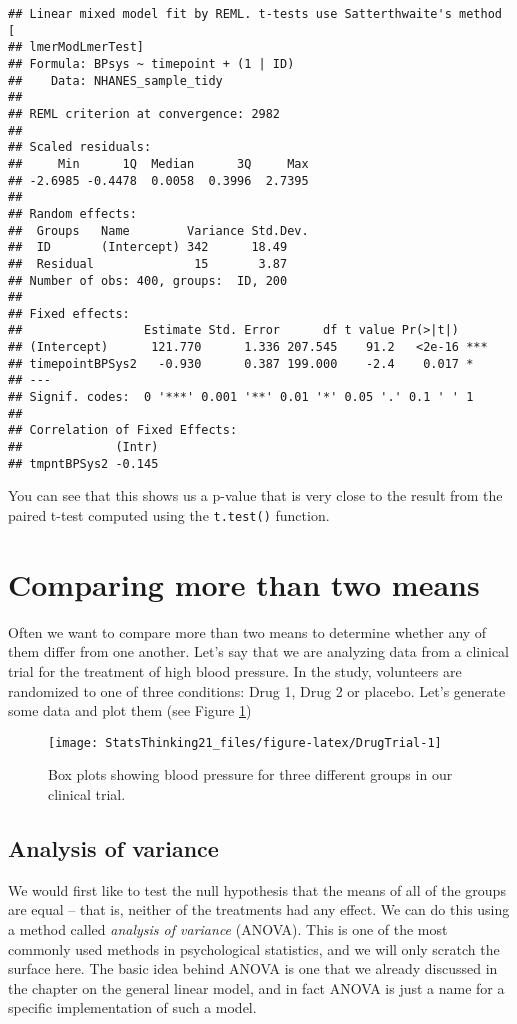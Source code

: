 \documentclass[]{book}
\theoremstyle{definition}
\theoremstyle{definition}
\theoremstyle{definition}
\theoremstyle{remark}
\begin{document}
\begin{verbatim}
## Linear mixed model fit by REML. t-tests use Satterthwaite's method [
## lmerModLmerTest]
## Formula: BPsys ~ timepoint + (1 | ID)
##    Data: NHANES_sample_tidy
## 
## REML criterion at convergence: 2982
## 
## Scaled residuals: 
##     Min      1Q  Median      3Q     Max 
## -2.6985 -0.4478  0.0058  0.3996  2.7395 
## 
## Random effects:
##  Groups   Name        Variance Std.Dev.
##  ID       (Intercept) 342      18.49   
##  Residual              15       3.87   
## Number of obs: 400, groups:  ID, 200
## 
## Fixed effects:
##                 Estimate Std. Error      df t value Pr(>|t|)    
## (Intercept)      121.770      1.336 207.545    91.2   <2e-16 ***
## timepointBPSys2   -0.930      0.387 199.000    -2.4    0.017 *  
## ---
## Signif. codes:  0 '***' 0.001 '**' 0.01 '*' 0.05 '.' 0.1 ' ' 1
## 
## Correlation of Fixed Effects:
##             (Intr)
## tmpntBPSys2 -0.145
\end{verbatim}

You can see that this shows us a p-value that is very close to the
result from the paired t-test computed using the \texttt{t.test()}
function.

\section{Comparing more than two
means}\label{comparing-more-than-two-means}

Often we want to compare more than two means to determine whether any of
them differ from one another. Let's say that we are analyzing data from
a clinical trial for the treatment of high blood pressure. In the study,
volunteers are randomized to one of three conditions: Drug 1, Drug 2 or
placebo. Let's generate some data and plot them (see Figure
\ref{fig:DrugTrial})

\begin{figure}
\texttt{[image: StatsThinking21\_files/figure-latex/DrugTrial-1]} \caption{Box plots showing blood pressure for three different groups in our clinical trial.}\label{fig:DrugTrial}
\end{figure}

\subsection{Analysis of variance}\label{analysis-of-variance}

We would first like to test the null hypothesis that the means of all of
the groups are equal -- that is, neither of the treatments had any
effect. We can do this using a method called \emph{analysis of variance}
(ANOVA). This is one of the most commonly used methods in psychological
statistics, and we will only scratch the surface here. The basic idea
behind ANOVA is one that we already discussed in the chapter on the
general linear model, and in fact ANOVA is just a name for a specific
implementation of such a model.
\end{document}
